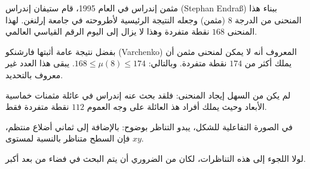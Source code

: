 \begin{surferPage}{مثمن إندراس}
    في العام 1995، قام ستيفان إندراس
    \textenglish{(Stephan Endraß)} ببناء هذا المنحنى من الدرجة $8$ (مثمن) وجعله النتيجة الرئيسية لأطروحته في جامعة إرلنغن.
     لهذا المنحنى $168$ نقطة متفردة وهذا لا يزال إلى اليوم الرقم القياسي العالمي.

     بفضل نتيجة عامة أثبتها فارشنكو
     \textenglish{(Varchenko)}
       المعروف أنه لا يمكن لمنحنى مثمن أن يملك أكثر من $174$ نقطة متفردة.
    وبالتالي: $168 \le \mu(8) \le 174$.
    يبقى هذا العدد غير معروف بالتحديد.

     لم يكن من السهل إيجاد المنحنى: فلقد بحث عنه إندراس في عائلة مثمنات خماسية الأبعاد وحيث يملك أفراد هذ العائلة على وجه العموم $112$ نقطة متفردة فقط.

    في الصورة التفاعلية للشكل، يبدو التناظر بوضوح:
    بالإضافة إلى ثماني أضلاع منتظم، فإن السطح متناظر بالنسبة لمستوى $xy$.

     لولا اللجوء إلى هذه التناظرات، لكان من الضروري أن يتم البحث في فضاء من بعد أكبر.
\end{surferPage}

